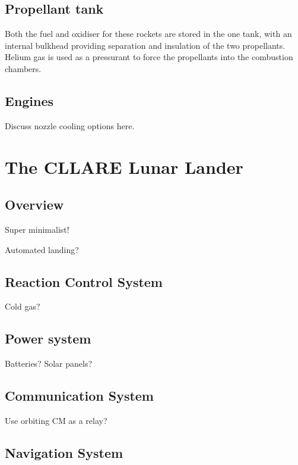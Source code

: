 \documentclass{report}
\begin{document}
\subsection{Propellant tank}

Both the fuel and oxidiser for these rockets are stored in the one tank, with an internal bulkhead providing separation and insulation of the two propellants.  Helium gas is used as a pressurant to force the propellants into the combustion chambers.

\subsection{Engines}

Discuss nozzle cooling options here.


\section{The CLLARE Lunar Lander}

\subsection{Overview}

Super minimalist!

Automated landing?

\subsection{Reaction Control System}

Cold gas?

\subsection{Power system}

Batteries?  Solar panels?

\subsection{Communication System}

Use orbiting CM as a relay?

\subsection{Navigation System}
\end{document}
